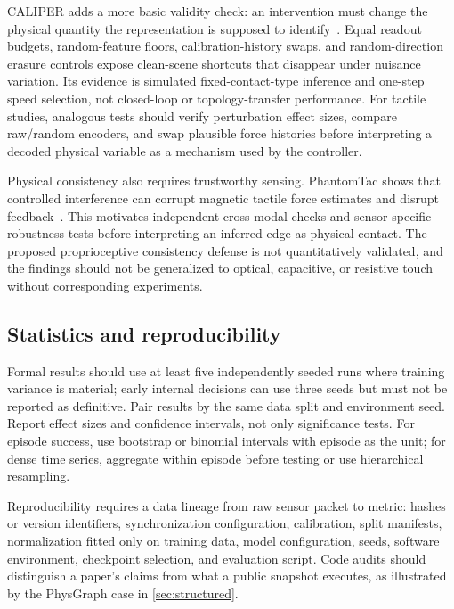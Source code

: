 CALIPER adds a more basic validity check: an intervention must change the physical
quantity the representation is supposed to identify~\cite{mehta2026caliper}.
Equal readout budgets, random-feature floors, calibration-history swaps, and
random-direction erasure controls expose clean-scene shortcuts that disappear
under nuisance variation. Its evidence is simulated fixed-contact-type inference
and one-step speed selection, not closed-loop or topology-transfer performance.
For tactile studies, analogous tests should verify perturbation effect sizes,
compare raw/random encoders, and swap plausible force histories before interpreting
a decoded physical variable as a mechanism used by the controller.

Physical consistency also requires trustworthy sensing. PhantomTac shows that
controlled interference can corrupt magnetic tactile force estimates and disrupt
feedback~\cite{update2026phantomtac}. This motivates independent cross-modal
checks and sensor-specific robustness tests before interpreting an inferred edge
as physical contact. The proposed proprioceptive consistency defense is not
quantitatively validated, and the findings should not be generalized to optical,
capacitive, or resistive touch without corresponding experiments.

\subsection{Statistics and reproducibility}

Formal results should use at least five independently seeded runs where training
variance is material; early internal decisions can use three seeds but must not be
reported as definitive. Pair results by the same data split and environment seed.
Report effect sizes and confidence intervals, not only significance tests. For
episode success, use bootstrap or binomial intervals with episode as the unit;
for dense time series, aggregate within episode before testing or use hierarchical
resampling.

Reproducibility requires a data lineage from raw sensor packet to metric: hashes or
version identifiers, synchronization configuration, calibration, split manifests,
normalization fitted only on training data, model configuration, seeds, software
environment, checkpoint selection, and evaluation script. Code audits should
distinguish a paper's claims from what a public snapshot executes, as illustrated
by the PhysGraph case in \cref{sec:structured}.

